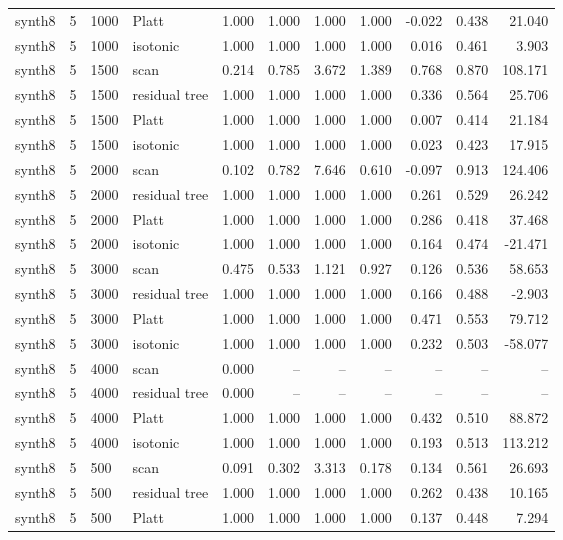 \begin{tabular}{lrllrrrrrrr}
synth8 & 5 & 1000 & Platt & 1.000 & 1.000 & 1.000 & 1.000 & -0.022 & 0.438 & 21.040 \\
synth8 & 5 & 1000 & isotonic & 1.000 & 1.000 & 1.000 & 1.000 & 0.016 & 0.461 & 3.903 \\
synth8 & 5 & 1500 & scan & 0.214 & 0.785 & 3.672 & 1.389 & 0.768 & 0.870 & 108.171 \\
synth8 & 5 & 1500 & residual tree & 1.000 & 1.000 & 1.000 & 1.000 & 0.336 & 0.564 & 25.706 \\
synth8 & 5 & 1500 & Platt & 1.000 & 1.000 & 1.000 & 1.000 & 0.007 & 0.414 & 21.184 \\
synth8 & 5 & 1500 & isotonic & 1.000 & 1.000 & 1.000 & 1.000 & 0.023 & 0.423 & 17.915 \\
synth8 & 5 & 2000 & scan & 0.102 & 0.782 & 7.646 & 0.610 & -0.097 & 0.913 & 124.406 \\
synth8 & 5 & 2000 & residual tree & 1.000 & 1.000 & 1.000 & 1.000 & 0.261 & 0.529 & 26.242 \\
synth8 & 5 & 2000 & Platt & 1.000 & 1.000 & 1.000 & 1.000 & 0.286 & 0.418 & 37.468 \\
synth8 & 5 & 2000 & isotonic & 1.000 & 1.000 & 1.000 & 1.000 & 0.164 & 0.474 & -21.471 \\
synth8 & 5 & 3000 & scan & 0.475 & 0.533 & 1.121 & 0.927 & 0.126 & 0.536 & 58.653 \\
synth8 & 5 & 3000 & residual tree & 1.000 & 1.000 & 1.000 & 1.000 & 0.166 & 0.488 & -2.903 \\
synth8 & 5 & 3000 & Platt & 1.000 & 1.000 & 1.000 & 1.000 & 0.471 & 0.553 & 79.712 \\
synth8 & 5 & 3000 & isotonic & 1.000 & 1.000 & 1.000 & 1.000 & 0.232 & 0.503 & -58.077 \\
synth8 & 5 & 4000 & scan & 0.000 & -- & -- & -- & -- & -- & -- \\
synth8 & 5 & 4000 & residual tree & 0.000 & -- & -- & -- & -- & -- & -- \\
synth8 & 5 & 4000 & Platt & 1.000 & 1.000 & 1.000 & 1.000 & 0.432 & 0.510 & 88.872 \\
synth8 & 5 & 4000 & isotonic & 1.000 & 1.000 & 1.000 & 1.000 & 0.193 & 0.513 & 113.212 \\
synth8 & 5 & 500 & scan & 0.091 & 0.302 & 3.313 & 0.178 & 0.134 & 0.561 & 26.693 \\
synth8 & 5 & 500 & residual tree & 1.000 & 1.000 & 1.000 & 1.000 & 0.262 & 0.438 & 10.165 \\
synth8 & 5 & 500 & Platt & 1.000 & 1.000 & 1.000 & 1.000 & 0.137 & 0.448 & 7.294 \\

\end{tabular}
